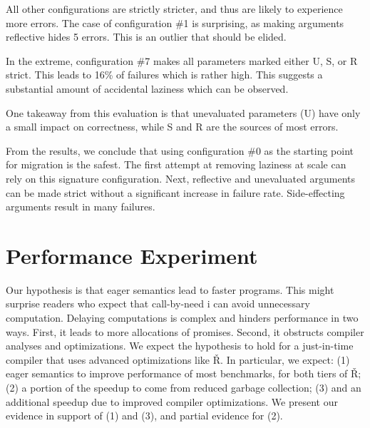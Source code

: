 \documentclass[review,creen,acmsmall]{acmart}
\renewcommand{\Rsh}{{\sf\v R}\xspace}
\newcommand{\config}[1]{configuration \#{#1}}
\begin{document}
All other configurations are strictly stricter, and thus are likely to experience
more errors. The case of \config 1 is surprising, as making arguments reflective
hides 5 errors. This is an outlier that should be elided.

In the extreme, \config 7 makes all parameters marked either U, S, or R strict.
This leads to 16\% of failures which is rather high. This suggests a substantial
amount of accidental laziness which can be observed.

One takeaway from this evaluation is that unevaluated parameters (U) have only a
small impact on correctness, while S and R are the sources of most errors.

From the results, we conclude that using \config 0 as the starting point for
migration is the safest. The first attempt at removing laziness at scale can rely on
this signature configuration. Next, reflective and unevaluated arguments can be
made strict without a significant increase in failure rate. Side-effecting
arguments result in many failures.


\section{Performance Experiment}\label{sec:rsh}

Our hypothesis is that eager semantics lead to faster programs. This might
surprise readers who expect that call-by-need i can avoid unnecessary
computation. Delaying computations is complex and hinders performance in two
ways. First, it leads to more allocations of promises. Second, it obstructs
compiler analyses and optimizations. We expect the hypothesis to hold for a
just-in-time compiler that uses advanced optimizations like \Rsh. In particular,
we expect: (1) eager semantics to improve performance of most benchmarks, for
both tiers of \Rsh; (2) a portion of the speedup to come from reduced garbage
collection; (3) and an additional speedup due to improved compiler
optimizations. We present our evidence in support of (1) and (3), and partial
evidence for (2).
\end{document}
